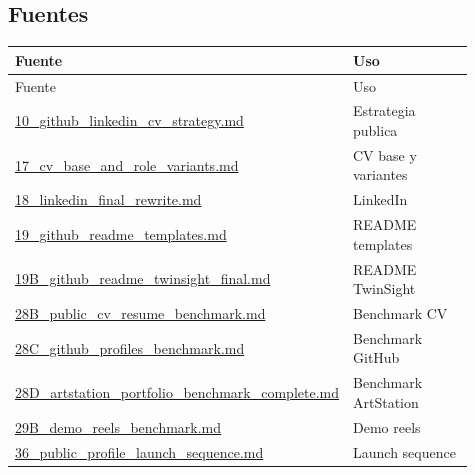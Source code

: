 \subsection{Fuentes}


\begin{center}
\scriptsize
\begin{longtable}{>{\raggedright\arraybackslash}p{0.455\linewidth} >{\raggedright\arraybackslash}p{0.455\linewidth}}
\toprule
Fuente & Uso \\
\midrule
\endfirsthead
\toprule
Fuente & Uso \\
\midrule
\endhead
\href{file:///E:/Laboral/10_github_linkedin_cv_strategy.md}{10\_github\_linkedin\_cv\_strategy.md} & Estrategia publica \\
\href{file:///E:/Laboral/17_cv_base_and_role_variants.md}{17\_cv\_base\_and\_role\_variants.md} & CV base y variantes \\
\href{file:///E:/Laboral/18_linkedin_final_rewrite.md}{18\_linkedin\_final\_rewrite.md} & LinkedIn \\
\href{file:///E:/Laboral/19_github_readme_templates.md}{19\_github\_readme\_templates.md} & README templates \\
\href{file:///E:/Laboral/19B_github_readme_twinsight_final.md}{19B\_github\_readme\_twinsight\_final.md} & README TwinSight \\
\href{file:///E:/Laboral/28B_public_cv_resume_benchmark.md}{28B\_public\_cv\_resume\_benchmark.md} & Benchmark CV \\
\href{file:///E:/Laboral/28C_github_profiles_benchmark.md}{28C\_github\_profiles\_benchmark.md} & Benchmark GitHub \\
\href{file:///E:/Laboral/28D_artstation_portfolio_benchmark_complete.md}{28D\_artstation\_portfolio\_benchmark\_complete.md} & Benchmark ArtStation \\
\href{file:///E:/Laboral/29B_demo_reels_benchmark.md}{29B\_demo\_reels\_benchmark.md} & Demo reels \\
\href{file:///E:/Laboral/36_public_profile_launch_sequence.md}{36\_public\_profile\_launch\_sequence.md} & Launch sequence \\
\bottomrule
\end{longtable}
\end{center}
